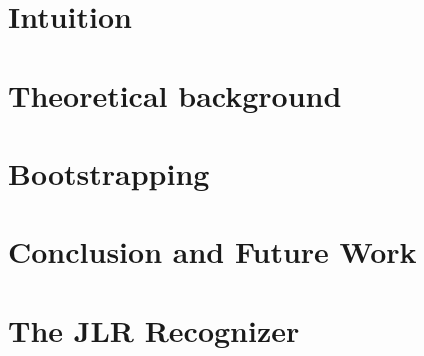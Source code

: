 \documentclass[nonatbib,preprint,numbers]{sigplanconf}
\begin{document}
\section{Intuition}
\label{section:recognizer}


\section{Theoretical background}
\label{section:theoretical-background}


\section{Bootstrapping \Fajita}
\label{section:bootstrapping}


\section{Conclusion and Future Work}
\label{section:zz}



\small


\clearpage
\appendix
\section{The JLR Recognizer}

\end{document}
